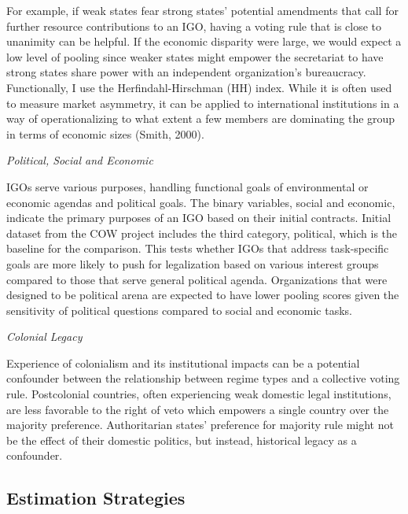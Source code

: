 \documentclass[12pt]{article}
\begin{document}
\begin{itemize}
For example, if weak states fear strong states’ potential amendments that call for further resource contributions to an IGO, having a voting rule that is close to unanimity can be helpful. If the economic disparity were large, we would expect a low level of pooling since weaker states might empower the secretariat to have strong states share power with an independent organization’s bureaucracy. Functionally, I use the Herfindahl-Hirschman (HH) index. While it is often used to measure market asymmetry, it can be applied to international institutions in a way of operationalizing to what extent a few members are dominating the group in terms of economic sizes (Smith, 2000).  

\textit{Political, Social and Economic}


IGOs serve various purposes, handling functional goals of environmental or economic agendas and political goals. The binary variables, social and economic, indicate the primary purposes of an IGO based on their initial contracts. Initial dataset from the COW project includes the third category, political, which is the baseline for the comparison. This tests whether IGOs that address task-specific goals are more likely to push for legalization based on various interest groups compared to those that serve general political agenda. Organizations that were designed to be political arena are expected to have lower pooling scores given the sensitivity of political questions compared to social and economic tasks. 

\textit{Colonial Legacy}

Experience of colonialism and its institutional impacts can be a potential confounder between the relationship between regime types and a collective voting rule. Postcolonial countries, often experiencing weak domestic legal institutions, are less favorable to the right of veto which empowers a single country over the majority preference. Authoritarian states’ preference for majority rule might not be the effect of their domestic politics, but instead, historical legacy as a confounder.

\subsection{Estimation Strategies}


\end{itemize}
\end{document}
